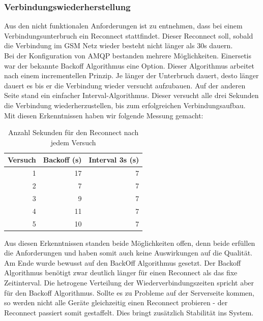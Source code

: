 \subsubsection{Verbindungswiederherstellung}
Aus den nicht funktionalen Anforderungen ist zu entnehmen, dass bei einem Verbindungsunterbruch ein Reconnect stattfindet. Dieser Reconnect soll, sobald die Verbindung im GSM Netz wieder besteht nicht länger als 30s dauern. \\

Bei der Konfiguration von AMQP bestanden mehrere Möglichkeiten. Einersetis war der bekannte Backoff Algorithmus eine Option. Dieser Algorithmus arbeitet nach einem incrementellen Prinzip. Je länger der Unterbruch dauert, desto länger dauert es bis er die Verbindung wieder versucht aufzubauen. Auf der anderen Seite stand ein einfacher Interval-Algorithmus. Dieser versucht alle drei Sekunden die Verbindung wiederherzustellen, bis zum erfolgreichen Verbindungsaufbau. \\
Mit diesen Erkenntnissen haben wir folgende Messung gemacht:
\begin{table}
	\centering
	\begin{tabular}{|r|r|r|}
		\hline
		\textbf{Versuch} & \textbf{Backoff (s) } & \textbf{Interval 3s (s)} \\
		\hline
		1 & 17 & 7 \\
		2 &	7 & 7 \\
		3 & 9 & 7 \\
 		4 & 11 & 7 \\
		5 & 10 & 7 \\
		\hline
	\end{tabular}
	\caption{Anzahl Sekunden für den Reconnect nach jedem Versuch}
\end{table}
Aus diesen Erkenntnissen standen beide Möglichkeiten offen, denn beide erfüllen die Anforderungen und haben somit auch keine Auswirkungen auf die Qualität. Am Ende wurde bewusst auf den BackOff Algorithmus gesetzt. Der Backoff Algorithmus benötigt zwar deutlich länger für einen Reconnect als das fixe Zeitinterval. Die hetrogene Verteilung der Wiederverbindungszeiten spricht aber für den Backoff Algorithmus. Sollte es zu Probleme auf der Serverseite kommen, so werden nicht alle Geräte gleichzeitig einen Reconnect probieren - der Reconnect passiert somit gestaffelt. Dies bringt zusätzlich Stabilität ins System.

